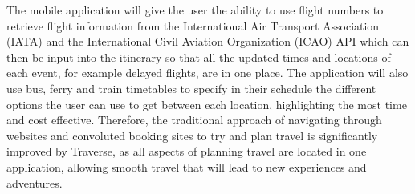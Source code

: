 The mobile application will give the user the ability to use flight numbers to retrieve flight information from the International Air Transport Association (IATA) and the International Civil Aviation Organization (ICAO) API which can then be input into the itinerary so that all the updated times and locations of each event, for example delayed flights, are in one place. The application will also use bus, ferry and train timetables to specify in their schedule the different options the user can use to get between each location, highlighting the most time and cost effective. Therefore, the traditional approach of navigating through websites and convoluted booking sites to try and plan travel is significantly improved by Traverse, as all aspects of planning travel are located in one application, allowing smooth travel that will lead to new experiences and adventures.



